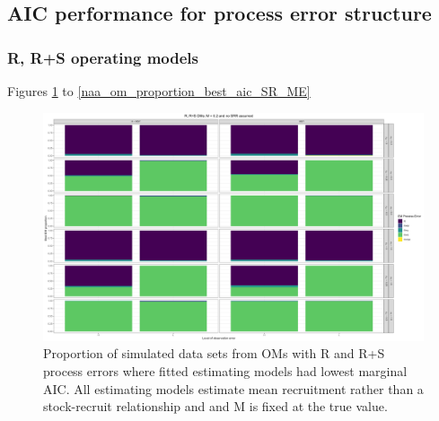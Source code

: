 \documentclass[
  12pt,
]{article}
\begin{document}
\hypertarget{aic-performance-for-process-error-structure}{%
\subsection*{AIC performance for process error
structure}\label{aic-performance-for-process-error-structure}}

\hypertarget{r-rs-operating-models-1}{%
\subsubsection*{R, R+S operating models}\label{r-rs-operating-models-1}}

Figures \ref{naa_om_proportion_best_aic_R_MF} to
\ref{naa_om_proportion_best_aic_SR_ME}

\begin{landscape}
\begin{figure}
\caption{Proportion of simulated data sets from OMs with R and R+S process errors where fitted estimating models had lowest marginal AIC. All estimating models estimate mean recruitment rather than a stock-recruit relationship and and M is fixed at the true value.} \label{naa_om_proportion_best_aic_R_MF}
\begin{center}
\includegraphics[width = \textwidth]{naa_om_proportion_best_aic_R_MF.png}
\end{center}
\end{figure}
\end{landscape}
\end{document}
